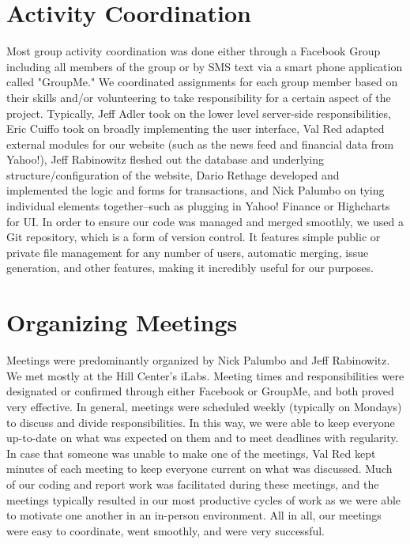 \section{Activity Coordination}
Most group activity coordination was done either through a Facebook Group including all members of the group or by SMS text via a smart phone application called "GroupMe." We coordinated assignments for each group member based on their skills and/or volunteering to take responsibility for a certain aspect of the project. Typically, Jeff Adler took on the lower level server-side responsibilities, Eric Cuiffo took on broadly implementing the user interface, Val Red adapted external modules for our website (such as the news feed and financial data from Yahoo!), Jeff Rabinowitz fleshed out the database and underlying structure/configuration of the website, Dario Rethage developed and implemented the logic and forms for transactions, and Nick Palumbo on tying individual elements together--such as plugging in Yahoo! Finance or Highcharts for UI. In order to ensure our code was managed and merged smoothly, we used a Git repository, which is a form of version control. It features simple public or private file management for any number of users, automatic merging, issue generation, and other features, making it incredibly useful for our purposes.

\section{Organizing Meetings}
Meetings were predominantly organized by Nick Palumbo and Jeff Rabinowitz. We met mostly at the Hill Center's iLabs. Meeting times and responsibilities were designated or confirmed through either Facebook or GroupMe, and both proved very effective. In general, meetings were scheduled weekly (typically on Mondays) to discuss and divide responsibilities. In this way, we were able to keep everyone up-to-date on what was expected on them and to meet deadlines with regularity. In case that someone was unable to make one of the meetings, Val Red kept minutes of each meeting to keep everyone current on what was discussed. Much of our coding and report work was facilitated during these meetings, and the meetings typically resulted in our most productive cycles of work as we were able to motivate one another in an in-person environment. All in all, our meetings were easy to coordinate, went smoothly, and were very successful.
